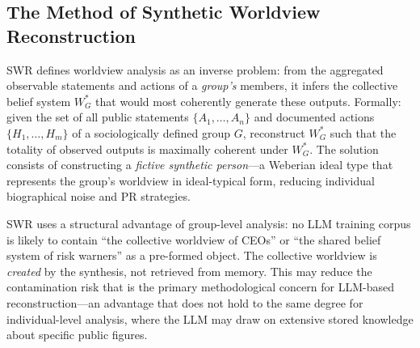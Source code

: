 \documentclass[12pt,a4paper]{article}
\begin{document}
\subsection{The Method of Synthetic Worldview Reconstruction}
\label{sec:methodik:swr}

SWR defines worldview analysis as an inverse problem: from the aggregated observable statements and actions of a \emph{group's} members, it infers the collective belief system $W_G^*$ that would most coherently generate these outputs. Formally: given the set of all public statements $\{A_1, \ldots, A_n\}$ and documented actions $\{H_1, \ldots, H_m\}$ of a sociologically defined group $G$, reconstruct $W_G^*$ such that the totality of observed outputs is maximally coherent under $W_G^*$. The solution consists of constructing a \emph{fictive synthetic person}---a Weberian ideal type that represents the group's worldview in ideal-typical form, reducing individual biographical noise and PR strategies.

SWR uses a structural advantage of group-level analysis: no LLM training corpus is likely to contain ``the collective worldview of CEOs'' or ``the shared belief system of risk warners'' as a pre-formed object. The collective worldview is \emph{created} by the synthesis, not retrieved from memory. This may reduce the contamination risk that is the primary methodological concern for LLM-based reconstruction---an advantage that does not hold to the same degree for individual-level analysis, where the LLM may draw on extensive stored knowledge about specific public figures.
\end{document}
